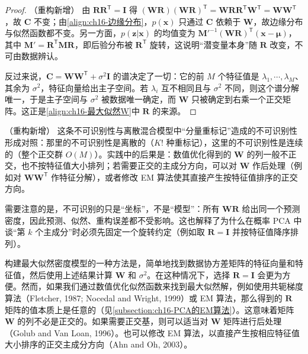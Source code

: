 \documentclass[../../main.tex]{subfiles}
\begin{document}
\begin{proof}（重构新增）
由 $\bm{R}\bm{R}^{\mathsf T}=\bm{I}$ 得 $(\bm{W}\bm{R})(\bm{W}\bm{R})^{\mathsf T}=\bm{W}\bm{R}\bm{R}^{\mathsf T}\bm{W}^{\mathsf T}=\bm{W}\bm{W}^{\mathsf T}$，故 $\bm{C}$ 不变；由\eqref{align:ch16-边缘分布}，$p(\bm{x})$ 只通过 $\bm{C}$ 依赖于 $\bm{W}$，故边缘分布与似然函数都不变。另一方面，$p(\bm{z}|\bm{x})$ 的均值变为 $\bm{M}'^{-1}(\bm{W}\bm{R})^{\mathsf T}(\bm{x}-\bm{\mu})$，其中 $\bm{M}'=\bm{R}^{\mathsf T}\bm{M}\bm{R}$，即后验分布被 $\bm{R}^{\mathsf T}$ 旋转，这说明“潜变量本身”随 $\bm{R}$ 改变，不可由数据辨认。

反过来说，$\bm{C}=\bm{W}\bm{W}^{\mathsf T}+\sigma^2\bm{I}$ 的谱决定了一切：它的前 $M$ 个特征值是 $\lambda_1,\cdots,\lambda_M$、其余为 $\sigma^2$，特征向量给出主子空间。若 $\lambda_i$ 互不相同且与 $\sigma^2$ 不同，则这个谱分解唯一，于是主子空间与 $\sigma^2$ 被数据唯一确定，而 $\bm{W}$ 只被确定到右乘一个正交矩阵。这正是\eqref{align:ch16-最大似然W}中 $\bm{R}$ 的来源。
\end{proof}

\begin{remark}（重构新增）
这条不可识别性与离散混合模型中“分量重标记”造成的不可识别性形成对照：那里的不可识别性是离散的（$K!$ 种重标记），这里的不可识别性是连续的（整个正交群 $O(M)$）。实践中的后果是：数值优化得到的 $\bm{W}$ 的列一般不正交，也不按特征值大小排列；若需要正交的主成分方向，可以对 $\bm{W}$ 作后处理（例如对 $\bm{W}\bm{W}^{\mathsf T}$ 作特征分解），或者修改 EM 算法使其直接产生按特征值排序的正交方向。

需要注意的是，不可识别的只是“坐标”，不是“模型”：所有 $\bm{W}\bm{R}$ 给出同一个预测密度，因此预测、似然、重构误差都不受影响。这也解释了为什么在概率 PCA 中谈“第 $k$ 个主成分”时必须先固定一个旋转约定（例如取 $\bm{R}=\bm{I}$ 并按特征值降序排列）。
\end{remark}

构建最大似然密度模型的一种方法是，简单地找到数据协方差矩阵的特征向量和特征值，然后使用上述结果计算 $\bm{W}$ 和 $\sigma^2$。在这种情况下，选择 $\bm{R}=\bm{I}$ 会更为方便。然而，如果我们通过数值优化似然函数来找到最大似然解，例如使用共轭梯度算法（Fletcher, 1987; Nocedal and Wright, 1999）或 EM 算法，那么得到的 $\bm{R}$ 矩阵的值本质上是任意的（见\cref{subsection:ch16-PCA的EM算法}）。这意味着矩阵 $\bm{W}$ 的列不必是正交的。如果需要正交基，则可以适当对 $\bm{W}$ 矩阵进行后处理（Golub and Van Loan, 1996）。也可以修改 EM 算法，以直接产生按相应特征值大小排序的正交主成分方向（Ahn and Oh, 2003）。
\end{document}
